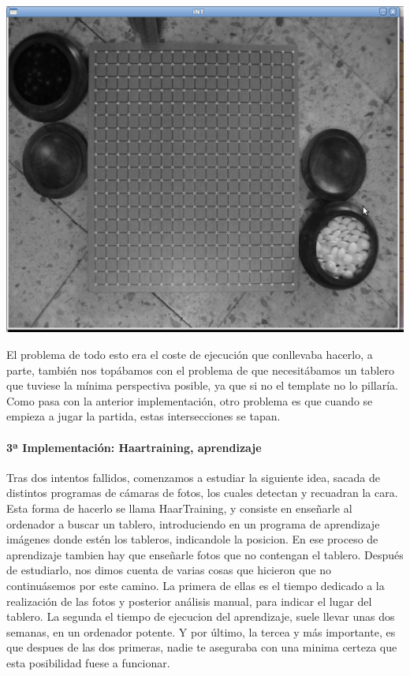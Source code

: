 \documentclass[12pt,a4paper]{report}
\begin{document}
\includegraphics[scale=0.6]{detec-intersecciones.png}

El problema de todo esto era el coste de ejecución que conllevaba hacerlo, a
parte, también nos topábamos con el problema de que necesitábamos un tablero que
tuviese la mínima perspectiva posible, ya que si no el template no lo pillaría. 
Como pasa con la anterior implementación, otro problema es que cuando se empieza
a jugar la partida, estas intersecciones se tapan. 


\paragraph{3ª Implementación: Haartraining, aprendizaje}

Tras dos intentos fallidos, comenzamos a estudiar la siguiente idea, sacada de
distintos programas de cámaras de fotos, los cuales detectan y recuadran la
cara. Esta forma de hacerlo se llama HaarTraining, y consiste en enseñarle al
ordenador a buscar un tablero, introduciendo en un programa de aprendizaje
imágenes donde estén los tableros, indicandole la posicion. En ese proceso de
aprendizaje tambien hay que enseñarle fotos que no contengan el tablero.
Después de estudiarlo, nos dimos cuenta de varias cosas que hicieron que no
continuásemos por este camino. La primera de ellas es el tiempo dedicado a la
realización de las fotos y posterior análisis manual, para indicar el lugar del
tablero. La segunda el tiempo de ejecucion del aprendizaje, suele llevar unas
dos semanas, en un ordenador potente. Y por último, la tercea y más importante,
es que despues de las dos primeras, nadie te aseguraba con una minima certeza 
que esta posibilidad fuese a funcionar.
\end{document}
